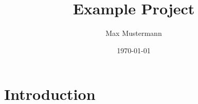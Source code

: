 \documentclass{article}
\title{Example Project}
\author{Max Mustermann}
\date{\today}
\begin{document}
\maketitle

\section{Introduction}
\end{document}
